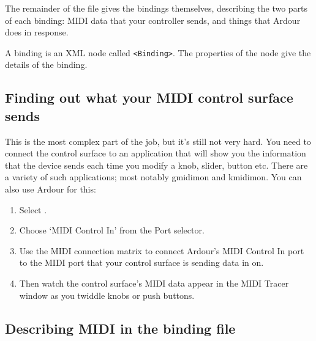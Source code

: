 \documentclass[10pt,a4paper]{book}
\newcommand{\menu}[1]{\emph{\StrSubstitute{#1}{,}{ $\rightarrow$ }}}
\begin{document}
The remainder of the file gives the bindings themselves, describing
the two parts of each binding: MIDI data that your controller sends,
and things that Ardour does in response.

A binding is an XML node called \texttt{<Binding>}.  The properties of the
node give the details of the binding.  



\subsection{Finding out what your MIDI control surface sends}

This is the most complex part of the job, but it's still not very hard.
You need to connect the control surface to an application that will
show you the information that the device sends each time you modify a
knob, slider, button etc.  There are a variety of such applications;
most notably gmidimon and kmidimon.  You can also use Ardour for this:

\begin{enumerate}
\item Select \menu{Window,MIDI Tracer}.
\item Choose `MIDI Control In' from the Port selector.
\item Use the MIDI connection matrix to connect Ardour's
MIDI Control In port to the MIDI port that your control surface is
sending data in on.
\item Then watch the control surface's MIDI data appear
in the MIDI Tracer window as you twiddle knobs or push buttons.
\end{enumerate}


\subsection{Describing MIDI in the binding file}
\end{document}
